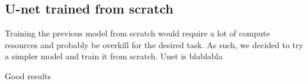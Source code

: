 \subsection{U-net trained from scratch}

Training the previous model from scratch would require a lot of compute resources and probably be overkill for the desired task. As
such, we decided to try a simpler model and train it from scratch. Unet is blablabla

Good results


